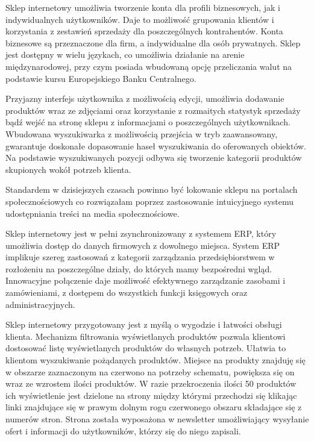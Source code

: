 	\par Sklep internetowy umożliwia tworzenie konta dla profili biznesowych, jak i indywidualnych użytkowników. Daje to możliwość grupowania klientów i korzystania z zestawień sprzedaży dla poszczególnych kontrahentów. Konta biznesowe są przeznaczone dla firm, a indywidualne dla osób prywatnych. Sklep jest dostępny w wielu językach, co umożliwia działanie na arenie międzynarodowej, przy czym posiada wbudowaną opcję przeliczania walut na podstawie kursu Europejskiego Banku Centralnego. 
		
	\par Przyjazny interfejs użytkownika z możliwością edycji, umożliwia dodawanie produktów wraz ze zdjęciami oraz korzystanie z rozmaitych statystyk sprzedaży bądź  wejść na stronę sklepu z informacjami o poszczególnych użytkownikach. Wbudowana wyszukiwarka z możliwością przejścia w tryb zaawansowany, gwarantuje doskonałe dopasowanie haseł wyszukiwania do oferowanych obiektów. Na podstawie wyszukiwanych pozycji odbywa się tworzenie kategorii produktów skupionych wokół potrzeb klienta.
		
	\par Standardem w dzisiejszych czasach powinno być lokowanie sklepu na portalach społecznościowych co rozwiązałam poprzez zastosowanie intuicyjnego systemu udostępniania treści na media społecznościowe.

	\par Sklep internetowy jest w pełni zsynchronizowany z systemem ERP, który umożliwia dostęp do danych firmowych z dowolnego miejsca. System ERP implikuje szereg zastosowań z kategorii zarządzania przedsiębiorstwem w rozłożeniu na poszczególne działy, do których mamy bezpośredni wgląd. Innowacyjne połączenie daje możliwość efektywnego zarządzanie zasobami i zamówieniami, z dostępem do wszystkich funkcji księgowych oraz administracyjnych.
		
	\par Sklep internetowy przygotowany jest z myślą o wygodzie i łatwości obsługi klienta. Mechanizm filtrowania wyświetlanych produktów pozwala klientowi dostosować listę wyświetlanych produktów do własnych potrzeb. Ułatwia to klientom wyszukiwanie pożądanych produktów. Miejsce na produkty znajduję się w obszarze zaznaczonym na czerwono na potrzeby schematu, powiększa się on wraz ze wzrostem ilości produktów. W razie przekroczenia ilości 50 produktów ich wyświetlenie jest dzielone na strony między którymi przechodzi się klikając linki znajdujące się w prawym dolnym rogu czerwonego obszaru składające się z numerów stron. Strona została wyposażona w newsletter umożliwiający wysyłanie ofert i informacji do użytkowników, którzy się do niego zapisali. 

